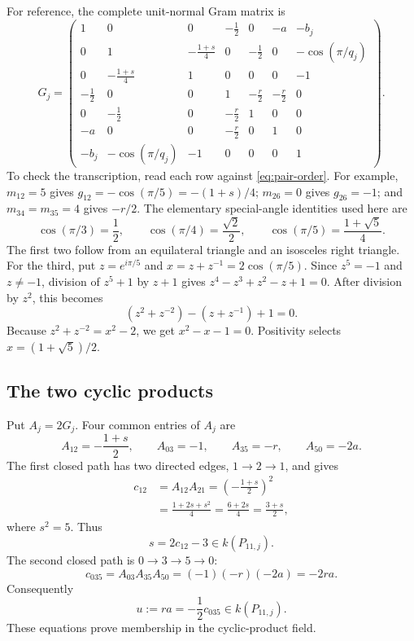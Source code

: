 \documentclass[11pt]{article}
\numberwithin{equation}{section}
\theoremstyle{definition}
\theoremstyle{remark}
\begin{document}
For reference, the complete unit-normal Gram matrix is
\begin{equation}
G_j=
\begin{pmatrix}
1&0&0&-\tfrac12&0&-a&-b_j\\
0&1&-\tfrac{1+s}{4}&0&-\tfrac12&0&-\cos(\pi/q_j)\\
0&-\tfrac{1+s}{4}&1&0&0&0&-1\\
-\tfrac12&0&0&1&-\tfrac r2&-\tfrac r2&0\\
0&-\tfrac12&0&-\tfrac r2&1&0&0\\
-a&0&0&-\tfrac r2&0&1&0\\
-b_j&-\cos(\pi/q_j)&-1&0&0&0&1
\end{pmatrix}.
\label{eq:full-gram}
\end{equation}
To check the transcription, read each row against \eqref{eq:pair-order}.
For example, \(m_{12}=5\) gives
\(g_{12}=-\cos(\pi/5)=-(1+s)/4\); \(m_{26}=0\) gives \(g_{26}=-1\);
and \(m_{34}=m_{35}=4\) gives \(-r/2\).  The elementary special-angle
identities used here are
\[
 \cos(\pi/3)=\frac12,\qquad
 \cos(\pi/4)=\frac{\sqrt2}{2},\qquad
 \cos(\pi/5)=\frac{1+\sqrt5}{4}.
\]
The first two follow from an equilateral triangle and an isosceles right
triangle.  For the third, put \(z=e^{i\pi/5}\) and
\(x=z+z^{-1}=2\cos(\pi/5)\).  Since \(z^5=-1\) and \(z\ne-1\), division of
\(z^5+1\) by \(z+1\) gives
\(z^4-z^3+z^2-z+1=0\).  After division by \(z^2\), this becomes
\[
 (z^2+z^{-2})-(z+z^{-1})+1=0.
\]
Because \(z^2+z^{-2}=x^2-2\), we get \(x^2-x-1=0\).  Positivity selects
\(x=(1+\sqrt5)/2\).

\subsection{The two cyclic products}
\label{subsec:two-cycles}

Put \(A_j=2G_j\).  Four common entries of \(A_j\) are
\begin{equation}
 A_{12}=-\frac{1+s}{2},\qquad
 A_{03}=-1,\qquad A_{35}=-r,
 \qquad A_{50}=-2a.
\label{eq:four-entries}
\end{equation}
The first closed path has two directed edges, \(1\to2\to1\), and gives
\begin{equation}
\begin{aligned}
 c_{12}
 &=A_{12}A_{21}
   =\left(-\frac{1+s}{2}\right)^2\\
 &=\frac{1+2s+s^2}{4}
   =\frac{6+2s}{4}
   =\frac{3+s}{2},
\end{aligned}
\label{eq:cycle12}
\end{equation}
where \(s^2=5\).  Thus
\begin{equation}
 s=2c_{12}-3\in k(P_{11,j}).
\label{eq:recover-s}
\end{equation}
The second closed path is \(0\to3\to5\to0\):
\begin{equation}
 c_{035}=A_{03}A_{35}A_{50}=(-1)(-r)(-2a)=-2ra.
\label{eq:cycle035}
\end{equation}
Consequently
\begin{equation}
 u:=ra=-\frac12c_{035}\in k(P_{11,j}).
\label{eq:recover-u}
\end{equation}
These equations prove membership in the cyclic-product field.
\end{document}
